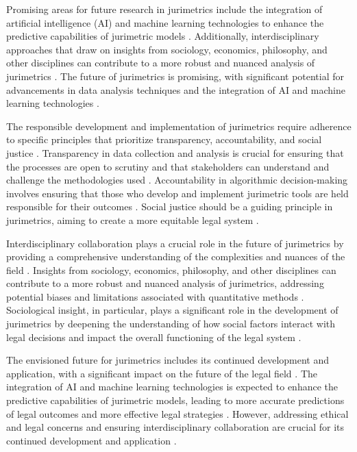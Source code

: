 Promising areas for future research in jurimetrics include the integration of artificial intelligence (AI) and machine learning technologies to enhance the predictive capabilities of jurimetric models \cite{silva2023role,nunes2016jurimetria}. Additionally, interdisciplinary approaches that draw on insights from sociology, economics, philosophy, and other disciplines can contribute to a more robust and nuanced analysis of jurimetrics \cite{silva2023role,nunes2016jurimetria}. The future of jurimetrics is promising, with significant potential for advancements in data analysis techniques and the integration of AI and machine learning technologies \cite{silva2023role,nunes2016jurimetria}.

The responsible development and implementation of jurimetrics require adherence to specific principles that prioritize transparency, accountability, and social justice \cite{10.1590/data.2022.65.3.267,10.1007/978-3-319-44000-2_15}. Transparency in data collection and analysis is crucial for ensuring that the processes are open to scrutiny and that stakeholders can understand and challenge the methodologies used \cite{10.1590/data.2022.65.3.267,10.1007/978-3-319-44000-2_15}. Accountability in algorithmic decision-making involves ensuring that those who develop and implement jurimetric tools are held responsible for their outcomes \cite{10.1590/data.2022.65.3.267,10.1007/978-3-319-44000-2_15}. Social justice should be a guiding principle in jurimetrics, aiming to create a more equitable legal system \cite{10.1590/data.2022.65.3.267,10.1007/978-3-319-44000-2_15}.

Interdisciplinary collaboration plays a crucial role in the future of jurimetrics by providing a comprehensive understanding of the complexities and nuances of the field \cite{silva2023role,nunes2016jurimetria}. Insights from sociology, economics, philosophy, and other disciplines can contribute to a more robust and nuanced analysis of jurimetrics, addressing potential biases and limitations associated with quantitative methods \cite{silva2023role,nunes2016jurimetria}. Sociological insight, in particular, plays a significant role in the development of jurimetrics by deepening the understanding of how social factors interact with legal decisions and impact the overall functioning of the legal system \cite{silva2023role,nunes2016jurimetria}.

The envisioned future for jurimetrics includes its continued development and application, with a significant impact on the future of the legal field \cite{silva2023role,nunes2016jurimetria}. The integration of AI and machine learning technologies is expected to enhance the predictive capabilities of jurimetric models, leading to more accurate predictions of legal outcomes and more effective legal strategies \cite{silva2023role,nunes2016jurimetria}. However, addressing ethical and legal concerns and ensuring interdisciplinary collaboration are crucial for its continued development and application \cite{silva2023role,nunes2016jurimetria}.

